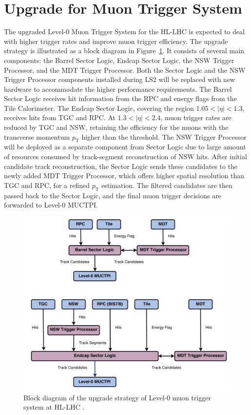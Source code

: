 \section{Upgrade for Muon Trigger System} \label{sec:MuonTriggerUpgrade}
The upgraded Level-0 Muon Trigger System for the HL-LHC is expected to deal with higher trigger rates and improve muon trigger efficiency. The upgrade strategy is illustrated as a block diagram in Figure~\ref{fig:muon_trigger_upgrade}. It consists of several main components: the Barrel Sector Logic, Endcap Sector Logic, the NSW Trigger Processor, and the MDT Trigger Processor. Both the Sector Logic and the NSW Trigger Processor components installed during LS2 will be replaced with new hardware to accommodate the higher performance requirements. The Barrel Sector Logic receives hit information from the RPC and energy flags from the Tile Calorimeter. The Endcap Sector Logic, covering the region $1.05 < |\eta| < 1.3$, receives hits from TGC and RPC. At $1.3 < |\eta| < 2.4$, muon trigger rates are reduced by TGC and NSW, retaining the efficiency for the muons with the transverse momentum $p_\mathrm{T}$ higher than the threshold. The NSW Trigger Processor will be deployed as a separate component from Sector Logic due to large amount of resources consumed by track-segment reconstruction of NSW hits. After initial candidate track reconstruction, the Sector Logic sends these candidates to the newly added MDT Trigger Processor, which offers higher spatial resolution than TGC and RPC, for a refined $p_\mathrm{T}$ estimation. The filtered candidates are then passed back to the Sector Logic, and the final muon trigger decisions are forwarded to Level-0 MUCTPI.

\begin{figure}[htbp]
  \centering
  \includegraphics[width=1.0\textwidth]{figs/chapter2/muon_trigger_upgrade.png}
  \caption{Block diagram of the upgrade strategy of Level-0 muon trigger system at HL-LHC \cite{TDAQ_TDR}.}
  \label{fig:muon_trigger_upgrade}
\end{figure}
